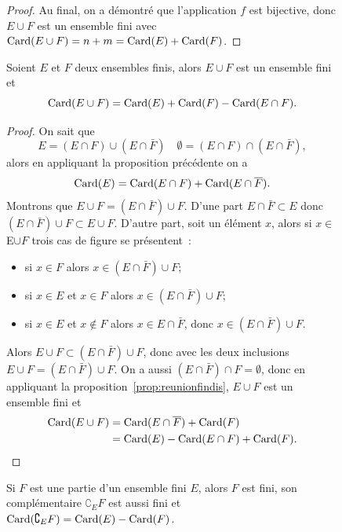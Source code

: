 \begin{figure}
\begin{proof}
    Au final, on a démontré que l'application \(f\) est bijective, donc \(E\cup F\) est un ensemble fini avec \(\operatorname{Card}(E\cup F)=n+m=\operatorname{Card}(E)+\operatorname{Card}(F)\).
  \end{proof}
  \begin{prop}
    Soient \(E\) et \(F\) deux ensembles finis, alors \(E\cup F\) est un ensemble fini et
    \begin{equation}
    \operatorname{Card}(E\cup F)=\operatorname{Card}(E)+\operatorname{Card}(F)-\operatorname{Card}(E\cap F).
  \end{equation}
\end{prop}
\begin{proof}
  On sait que 
  \begin{equation}
    E=(E\cap F)\cup (E\cap \bar{F}) \quad \emptyset=(E\cap F)\cap (E\cap \bar{F}),
  \end{equation} 
  alors en appliquant la proposition précédente on a
  \begin{equation}
    \operatorname{Card}(E)=\operatorname{Card}(E\cap F)+\operatorname{Card}(E\cap \overline{F}).
  \end{equation}
  Montrons que \(E\cup F =(E\cap \bar{F}) \cup F\). D'une part \(E \cap \bar{F} \subset E\) donc \((E\cap \bar{F}) \cup F \subset E\cup F\). D'autre part, soit un élément \(x\), alors si \(x \in \)E\( \cup F\) trois cas de figure se présentent~:
  \begin{itemize}
  \item si \(x\in F\) alors \(x \in (E\cap \bar{F}) \cup F\);
  \item si \(x \in E\) et \(x \in F\) alors \(x \in (E\cap \bar{F}) \cup F\);
  \item si \(x \in E\) et \(x \notin F\) alors \(x \in E\cap \bar{F}\), donc \(x \in (E\cap \bar{F}) \cup F\).
  \end{itemize}
  Alors \(E\cup F \subset (E \cap \bar{F})\cup F\), donc avec les deux inclusions \(E\cup F =(E\cap \bar{F}) \cup F\). On a aussi \((E\cap \bar{F})\cap F=\emptyset\), donc en appliquant la proposition~\ref{prop:reunionfindis}, \(E\cup F\) est un ensemble fini et
  \begin{align}
    \operatorname{Card}(E\cup F)&=\operatorname{Card}(E\cap \overline{F})+\operatorname{Card}(F)\\ &=\operatorname{Card}(E) - \operatorname{Card}(E\cap F)+\operatorname{Card}(F).
  \end{align}
\end{proof}
\begin{prop}
  Si \(F\) est une partie d'un ensemble fini \(E\), alors \(F\) est fini, son complémentaire \(\complement_E F\) est aussi fini et \(\operatorname{Card}(\complement_E F)=\operatorname{Card}(E)-\operatorname{Card}(F)\).
\end{prop}

\end{figure}
